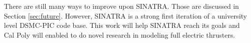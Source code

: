 \indent There are still many ways to improve upon SINATRA. Those are discussed in Section \ref{sec:future}. However, SINATRA is a strong first iteration of a university level DSMC-PIC code base. This work will help SINATRA reach its goals and Cal Poly will enabled to do novel research in modeling full electric thrusters.
